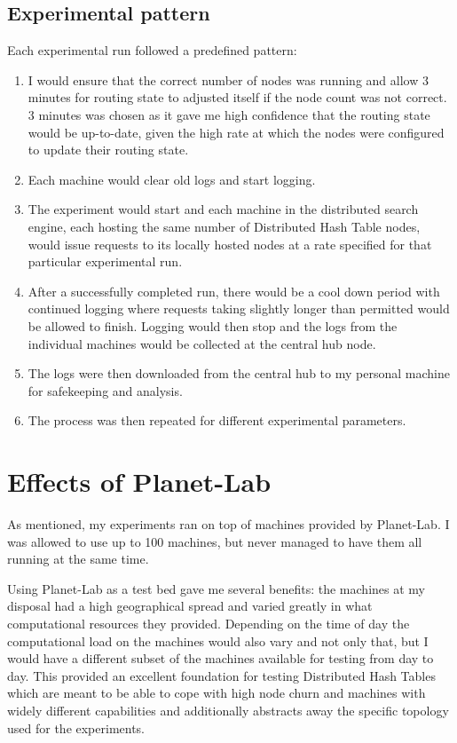 \subsection{Experimental pattern}
Each experimental run followed a predefined pattern:
\begin{enumerate}
\item I would ensure that the correct number of nodes was running and allow 3 minutes for routing state to adjusted itself if the node count was not correct. 3 minutes was chosen as it gave me high confidence that the routing state would be up-to-date, given the high rate at which the nodes were configured to update their routing state.
\item Each machine would clear old logs and start logging.
\item The experiment would start and each machine in the distributed search engine, each hosting the same number of Distributed Hash Table nodes, would issue requests to its locally hosted nodes at a rate specified for that particular experimental run.
\item After a successfully completed run, there would be a cool down period with continued logging where requests taking slightly longer than permitted would be allowed to finish. Logging would then stop and the logs from the individual machines would be collected at the central hub node.
\item The logs were then downloaded from the central hub to my personal machine for safekeeping and analysis.
\item The process was then repeated for different experimental parameters.
\end{enumerate}

\section{Effects of Planet-Lab}
As mentioned, my experiments ran on top of machines provided by Planet-Lab. I was allowed to use up to 100 machines, but never managed to have them all running at the same time.

Using Planet-Lab as a test bed gave me several benefits: the machines at my disposal had a high geographical spread and varied greatly in what computational resources they provided. Depending on the time of day the computational load on the machines would also vary and not only that, but I would have a different subset of the machines available for testing from day to day.
This provided an excellent foundation for testing Distributed Hash Tables which are meant to be able to cope with high node churn and machines with widely different capabilities and additionally abstracts away the specific topology used for the experiments.


